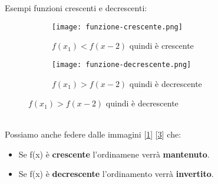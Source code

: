 \begin{example}
    Esempi funzioni crescenti e decrescenti:\\
    \begin{figure}[h!]
        \begin{subfigure}{.5\textwidth}
            \centering
            \texttt{[image: funzione-crescente.png]}
            \caption{$f(x_1) < f(x-2)$ quindi è crescente}
            \label{fig:funzione-crescente}
        \end{subfigure}
        \begin{subfigure}{.5\textwidth}
            \centering
            \texttt{[image: funzione-decrescente.png]}
            \caption{$f(x_1) > f(x-2)$ quindi è decrescente}
            \label{fig:funzione-decrescente}
        \end{subfigure}
    \end{figure}
    \\Possiamo anche federe dalle immagini [\ref{fig:funzione-crescente}] [\ref{fig:funzione-decrescente}] che:
    \begin{itemize}
        \item Se f(x) è \textbf{crescente} l'ordinamene verrà \textbf{mantenuto}.
        \item Se f(x) è \textbf{decrescente} l'ordinamento verrà \textbf{invertito}.\\
    \end{itemize}
\end{example}

